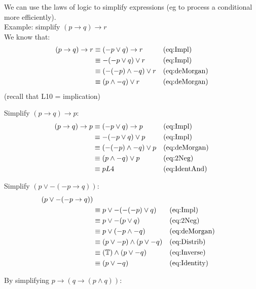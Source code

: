 We can use the laws of logic to simplify expressions (eg to process a
conditional more efficiently). \\

Example: simplify $(p \to q) \to r$ \\
We know that:
\begin{align}
  (p \to q) \to r
    & \equiv (-p \lor q) \to r       && \text{(eq:Impl)}\\
    & \equiv -(-p \lor q) \lor r     && \text{(eq:Impl)}\\
    & \equiv (-(-p) \land -q) \lor r && \text{(eq:deMorgan)}\\
    & \equiv (p \land -q) \lor r     && \text{(eq:deMorgan)}\\
\end{align}
(recall that L10 = implication)

Simplify $(p \to q) \to p$:
\begin{align}
 (p \to q) \to p
   & \equiv (-p \lor q) \to p       && \text{(eq:Impl)}\\
   & \equiv -(-p \lor q) \lor p     && \text{(eq:Impl)}\\
   & \equiv (-(-p) \land -q) \lor p && \text{(eq:deMorgan)}\\
   & \equiv (p \land -q) \lor p     && \text{(eq:2Neg)}\\
   & \equiv p L4                    && \text{(eq:IdentAnd)}
\end{align}

Simplify $(p \lor -(-p \to q))$:
\begin{align}
  (p \lor -(-p \to q)) & \\
       & \equiv p \lor -(-(-p) \lor q)         && \text{(eq:Impl)}\\
       & \equiv p \lor -(p \lor q)             && \text{(eq:2Neg)}\\
       & \equiv p \lor (-p \land -q)           && \text{(eq:deMorgan)}\\
       & \equiv (p \lor -p) \land (p \lor -q)  && \text{(eq:Distrib)}\\
       & \equiv (\mathbb{T}) \land (p \lor -q) && \text{(eq:Inverse)}\\
       & \equiv (p \lor -q)                     && \text{(eq:Identity)}
\end{align}

By simplifying $p \to (q \to (p \land q)) $:

